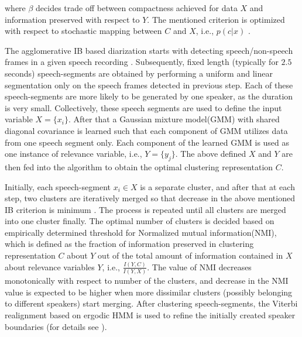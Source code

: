 \documentclass[conference]{IEEEtran}
\begin{document}
where $\beta$ decides trade off between compactness achieved for data $X$ and
information preserved with respect to $Y$. The mentioned criterion is optimized
with respect to stochastic mapping between $C$ and $X$, i.e., $p(c|x)$ . 

The agglomerative IB based diarization starts with detecting speech/non-speech
frames in a given speech recording \cite{aIB2}. Subsequently, fixed length
(typically for $2.5$ seconds) speech-segments are obtained by performing a
uniform and linear segmentation only on the speech frames detected in previous step. Each of 
these speech-segments are more likely to be generated by one speaker, as the duration
is very small. Collectively, these speech segments are used to define the input
variable $X={\{x_i\}}$. After that a Gaussian mixture model(GMM) with shared
diagonal covariance is learned such that each component of GMM utilizes data
from one speech segment only. Each component of the learned GMM is used as one instance of
relevance variable, i.e., $Y = \{ y_{j}\}$. The above defined $X$ and $Y$ are
then fed into the algorithm to obtain the optimal clustering representation $C$. 

Initially, each speech-segment $x_i \in X$ is a separate cluster, and after that
at each step, two clusters are iteratively merged so that decrease in the above
mentioned IB criterion is minimum \cite{aIB2}. The process is repeated until all
clusters are merged into one cluster finally. The optimal number of clusters
is decided based on empirically determined threshold for Normalized mutual
information(NMI), which is defined as the fraction of information preserved in
clustering representation $C$ about $Y$ out of the total amount of information
contained in $X$ about relevance variables $Y$, i.e., $\frac{I(Y,C)}{I(Y,X)}$.
The value of NMI decreases monotonically with respect to number of the clusters,
and decrease in the NMI value is expected to be higher when more dissimilar clusters
(possibly belonging to different speakers) start merging.  After clustering
speech-segments, the Viterbi realignment based on ergodic HMM is used to refine
the initially created speaker boundaries (for details see \cite{aIB2}).
\end{document}
